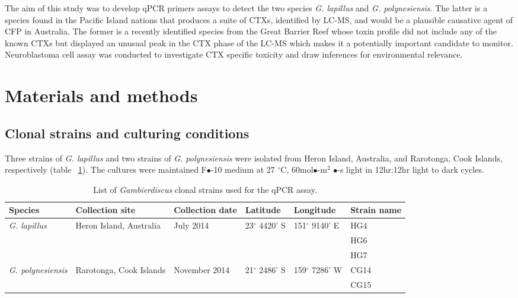 \documentclass[12pt]{article}
\begin{document}
The aim of this study was to develop qPCR primers assays to detect the two species \emph{G. lapillus} and \emph{G. polynesiensis}. The latter is a species found in the Pacific Island nations that produces a suite of CTXs, identified by LC-MS, and would be a plausible causative agent of CFP in Australia. The former is a recently identified species from the Great Barrier Reef whose toxin profile did not include any of the known CTXs but displayed an unusual peak in the CTX phase of the LC-MS which makes it a potentially important candidate to monitor. Neuroblastoma cell assay was conducted to investigate CTX specific toxicity and draw inferences for environmental relevance.
\newpage
\section{Materials and methods}
\subsection{Clonal strains and culturing conditions}
Three strains of \emph{G. lapillus} and two strains of \emph{G. polynesiensis} were isolated from Heron Island, Australia, and Rarotonga, Cook Islands, respectively (table ~\ref{tbl:StrainTable}). The cultures were maintained F$\bullet$-10 medium at 27 $^{\circ}$C, 60mol$\bullet$-m$^{2}$ $\bullet$-s light in 12hr:12hr light to dark cycles.
\FloatBarrier
\begin{table}
\caption{List of \emph{Gambierdiscus} clonal strains used for the qPCR assay.}
\label{tbl:StrainTable}
\begin{tabular}{ | p{2cm} | p{2cm} | p{2cm}| p{3cm} | p{3cm} | p{2cm} | }
\hline
\textbf{Species} & \textbf{Collection site} & \textbf{Collection date} &\textbf{Latitude} & \textbf{Longitude} & \textbf{Strain name} \\
\hline
\emph{G. lapillus} &Heron Island, Australia &July 2014 &23$^{\circ}$ 4420' S&151$^{\circ}$ 9140' E & HG4 \\
\hline
&&&&& HG6\\
\hline
&&&& &HG7\\
\hline
\emph{G. polynesiensis}&Rarotonga, Cook Islands&November 2014 &21$^{\circ}$ 2486' S&159$^{\circ}$ 7286' W & CG14 \\
\hline
&&&&&CG15\\
\hline
\end{tabular}
\end{table}
\end{document}
